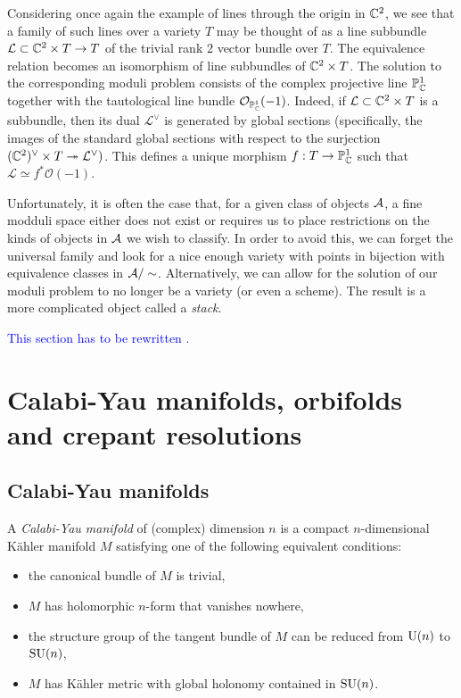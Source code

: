         Considering once again the example of lines through the origin in $\mathbb{C}^2$, we see that a family of such lines over a variety $T$ may be thought of as a line subbundle $\mathcal{L}\subset\mathbb{C}^2\times T\to T$ of the trivial rank $2$ vector bundle over $T$. The equivalence relation becomes an isomorphism of line subbundles of $\mathbb{C}^2\times T$. The solution to the corresponding moduli problem consists of the complex projective line $\mathbb{P}^1_{\mathbb{C}}$ together with the tautological line bundle $\mathcal{O}_{\mathbb{P}^1_{\mathbb{C}}}(-1)$. Indeed, if $\mathcal{L}\subset\mathbb{C}^2\times T$ is a subbundle, then its dual $\mathcal{L}^\vee$ is generated by global sections (specifically, the images of the standard global sections with respect to the surjection   $(\mathbb{C}^2)^\vee\times T\twoheadrightarrow\mathcal{L}^\vee)$. This defines a unique morphism $f:T\to\mathbb{P}^1_{\mathbb{C}}$ such that $\mathcal{L}\simeq f^*\mathcal{O}(-1)$.

        Unfortunately, it is often the case that, for a given class of objects $\mathcal{A}$, a fine modduli space either does not exist or requires us to place restrictions on the kinds of objects in $\mathcal{A}$ we wish to classify. In order to avoid this, we can forget the universal family and look for a nice enough variety with points in bijection with equivalence classes in $\mathcal{A}/\sim$. Alternatively, we can allow for the solution of our moduli problem to no longer be a variety (or even a scheme). The result is a more complicated object called a \emph{stack}.


    \textcolor{blue}{This section has to be rewritten \marker.}

\section{Calabi-Yau manifolds, orbifolds and crepant resolutions}\label{sec:CY}

    \subsection{Calabi-Yau manifolds}

        A \emph{Calabi-Yau manifold} of (complex) dimension $n$ is a compact $n$-dimensional Kähler manifold $M$ satisfying one of the following equivalent conditions:
        \begin{itemize}
            \item the canonical bundle of $M$ is trivial,
            \item $M$ has holomorphic $n$-form that vanishes nowhere,
            \item the structure group of the tangent bundle of $M$ can be reduced from $\text{U}(n)$ to $\text{SU}(n)$,
            \item $M$ has Kähler metric with global holonomy contained in $\text{SU}(n)$.
        \end{itemize}

